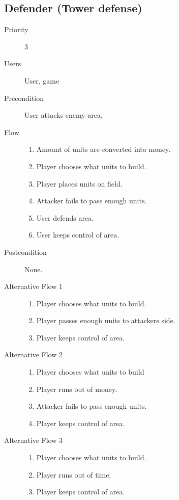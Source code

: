 \documentclass[12pt,a4paper]{article}
\begin{document}
\subsection{Defender (Tower defense)}
\begin{description}
\item[Priority] 3
\item[Users]  User, game
\item[Precondition]  User attacks enemy area.
\item[Flow]\mbox{}
  \begin{enumerate}
  \item Amount of units are converted into money.
  \item Player chooses what units to build.
  \item Player places units on field.
  \item Attacker fails to pass enough units.
  \item User defends area.
  \item User keeps control of area.
  \end{enumerate}
\item[Postcondition] None.
\item[Alternative Flow 1]\mbox{}
  \begin{enumerate}
  \item Player chooses what units to build.
  \item Player passes enough units to attackers side.
  \item Player keeps control of area.
  \end{enumerate}
\item[Alternative Flow 2]\mbox{}
  \begin{enumerate}
  \item Player chooses what units to build
  \item Player runs out of money.
  \item Attacker fails to pass enough units.
  \item Player keeps control of area.
  \end{enumerate}
\item[Alternative Flow 3]\mbox{}
  \begin{enumerate}
  \item Player chooses what units to build.
  \item Player runs out of time.
  \item Player keeps control of area.
  \end{enumerate}
\end{description}
\end{document}
